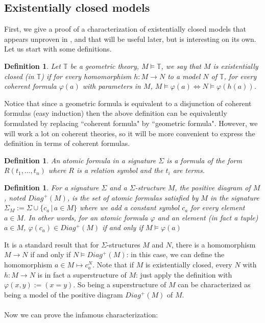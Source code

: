 \documentclass{article}
\newtheorem{definition}[theorem]{Definition}
\newcommand{\T}{\mathbb{T}}
\renewcommand{\phi}{\varphi}
\begin{document}
\subsection{Existentially closed models}
First, we give a proof of a characterization of existentially closed models that appears unproven in \cite{harun1996applications}, and that will be useful later, but is interesting on its own. Let us start with some definitions.
\begin{definition}
    Let $\T$ be a geometric theory, $M\models \mathbb{T}$, we say that $M$ is existentially closed (in $\mathbb{T}$) if for every homomorphism $h:M\xrightarrow{}N$ to a model $N$ of $\T$, for every coherent formula $\phi(a)$ with parameters in $M$, $M\models\phi(a)\Leftrightarrow N\models\phi(h(a))$.
\end{definition}
Notice that since a geometric formula is equivalent to a disjunction of coherent formulas (easy induction) then the above definition can be equivalently formulated by replacing ``coherent formula" by ``geometric formula". However, we will work a lot on coherent theories, so it will be more convenient to express the definition in terms of coherent formulas.
\begin{definition}
    An atomic formula in a signature $\Sigma$ is a formula of the form $R(t_1,\dots,t_n)$ where $R$ is a relation symbol and the $t_i$ are terms.
\end{definition}
\begin{definition}
    For a signature $\Sigma$ and a $\Sigma$-structure $M$, the positive diagram of $M$, noted $Diag^+(M)$, is the set of atomic formulas satisfied by $M$ in the signature $\Sigma_M:=\Sigma\cup\{c_a\,|\,a\in M\}$ where we add a constant symbol $c_a$ for every element $a\in M$.  In other words, for an atomic formula $\phi$ and an element (in fact a tuple) $a\in M$, $\phi(c_a)\in Diag^+(M)$ if and only if $M\models \phi(a)$
\end{definition}

It is a standard result that for $\Sigma$-structures $M$ and $N$, there is a homomorphism $M\xrightarrow{}N$ if and only if $N\models Diag^+(M)$: in this case, we can define the homomorphism $a\in M\mapsto c_a^N$. Note that if $M$ is existentially closed, every $N$ with $h:M\xrightarrow{}N$ is in fact a superstructure of $M$: just apply the definition with $\phi(x,y):=(x=y)$. So being a superstructure of $M$ can be characterized as being a model of the positive diagram $Diag^+(M)$ of $M$.\\
\\
Now we can prove the infamous characterization:
\end{document}
